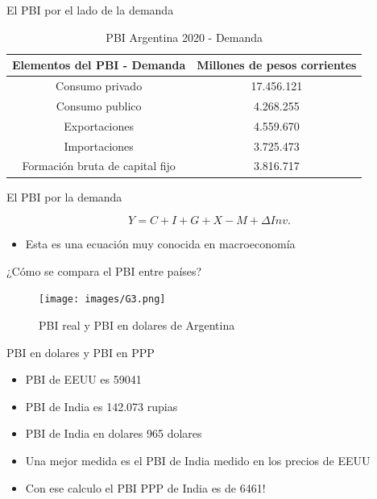\documentclass{beamer}
\begin{document}
\begin{frame}{El PBI por el lado de la demanda}
    \begin{table}[H]
\begin{tabular}{|c|c|}
\hline
\textbf{Elementos del PBI - Demanda} & \textbf{Millones de pesos corrientes} \\ \hline
Consumo privado                      & 17.456.121                            \\ \hline
Consumo publico                      & 4.268.255                             \\ \hline
Exportaciones                        & 4.559.670                             \\ \hline
Importaciones                        & 3.725.473                             \\ \hline
Formación bruta de capital fijo      & 3.816.717                             \\ \hline
\end{tabular}
\caption{PBI Argentina 2020 - Demanda}
\label{Tab:T38.2}
\end{table}

\end{frame}



\begin{frame}{El PBI por la demanda}
    
  \begin{equation}
        Y= C + I + G + X - M +  \Delta Inv.
  \end{equation}
  \begin{itemize}
  \item Esta es una ecuación muy conocida en macroeconomía
  \end{itemize}
\end{frame}

\begin{frame}{¿Cómo se compara el PBI entre países?}
    \begin{figure} [H]   \texttt{[image: images/G3.png]}
\caption{PBI real y PBI en dolares de Argentina}
\label{fig:G66}
\end{figure}
\end{frame}
                   
\begin{frame}{PBI en dolares y PBI en PPP}
\begin{itemize}
    \item PBI de EEUU es 59041
    \item PBI de India es 142.073 rupias
    \item PBI de India en dolares 965 dolares
    \item Una mejor medida es el PBI de India medido en los precios de EEUU
    \item Con ese calculo el PBI PPP de India es de 6461!
\end{itemize}
    
\end{frame}
\end{document}
